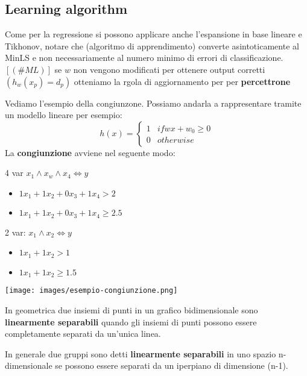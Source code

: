 \subsection{Learning algorithm}
Come per la regressione si possono applicare anche l'espansione in base lineare e Tikhonov, notare che (algoritmo di apprendimento) converte asintoticamente al MinLS e non
necessariamente al numero minimo di errori di classificazione. $[(\#ML)]$ se $w$ non vengono modificati per ottenere output corretti $(h_w(x_p) = d_p)$ otteniamo la rgola di aggiornamento per per \textbf{percettrone}
\begin{example}
    Vediamo l'esempio della congiunzone. Possiamo andarla a rappresentare tramite un modello lineare per esempio:
    $$h(x) = 
    \begin{cases}
        1 & if wx + w_0 \geq 0\\
        0 & otherwise
    \end{cases}
    $$
    La \textbf{congiunzione} avviene nel seguente modo: \\
    \begin{minipage}{.5\linewidth}
        4 var $x_1 \land x_w \land x_4 \Leftrightarrow y$
        \begin{itemize}
            \item $1x_1 + 1 x_2 + 0 x_3 + 1 x_4 > 2$
            \item $1x_1 + 1 x_2 + 0 x_3 + 1 x_4 \geq 2.5$
        \end{itemize}
        2 var: $x_1 \land x_2 \Leftrightarrow y$
        \begin{itemize}
            \item $1 x_1 + 1 x_2 > 1$
            \item $1 x_1 + 1 x_2 \geq 1.5$
        \end{itemize}
    \end{minipage}
    \hfill
    \begin{minipage}{.5\linewidth}
        \centering
        \texttt{[image: images/esempio-congiunzione.png]}
    \end{minipage}
\end{example}
\hspace{-15pt}In geometrica due insiemi di punti in un grafico bidimensionale sono \textbf{linearmente separabili} quando gli insiemi
di punti possono essere completamente separati da un'unica linea.
\begin{definition}
    In generale due gruppi sono detti \textbf{linearmente separabili} in uno spazio n-dimensionale se possono essere separati da un iperpiano di dimensione (n-1).
\end{definition}

